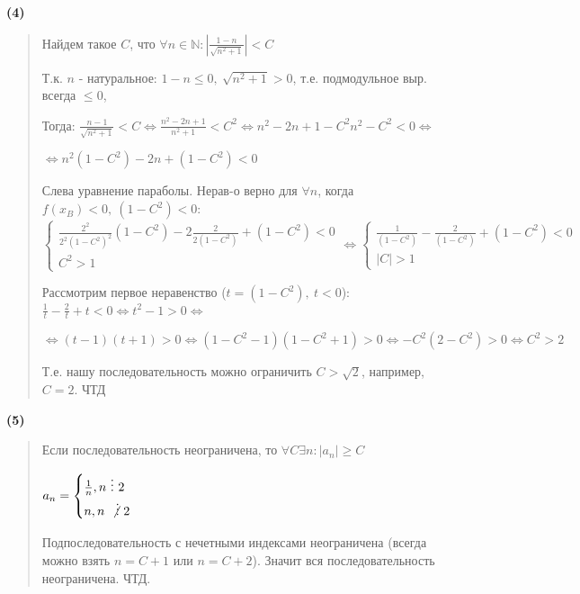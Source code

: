 \documentclass{article}
\begin{document}
\textsf{\textbf{(4)}}

\begin{quote}
Найдем такое $C$, что $\forall n \in \mathbb{N}: |\frac{1 - n}{\sqrt{n^2 + 1}}| < C$

Т.к. $n$ - натуральное: $1 - n \leq 0, \ \sqrt{n^2 + 1} > 0$, т.е. подмодульное выр. всегда $\leq 0$, 

Тогда: $\frac{n - 1}{\sqrt{n^2 + 1}} < C \Leftrightarrow 
\frac{n^2 - 2n + 1}{n^2 + 1} < C^2 \Leftrightarrow n^2 - 2n + 1 - C^2 n^2 - C^2 < 0 \Leftrightarrow$

$\Leftrightarrow n^2(1 - C^2) - 2n + (1 - C^2) < 0$

Слева уравнение параболы. Нерав-о верно для $\forall n$, когда $f(x_{B}) < 0, \ (1 - C^2) < 0$:
$
\begin{cases}
   \frac{2^2}{2^2(1 - C^2)^2}(1 - C^2) - 2\frac{2}{2(1 - C^2)} + (1 - C^2) < 0 \\
   C^2 > 1
\end{cases} \Longleftrightarrow
\begin{cases}
   \frac{1}{(1 - C^2)} - \frac{2}{(1 - C^2)} + (1 - C^2) < 0 \\
   |C| > 1
\end{cases}
$ 

Рассмотрим первое неравенство ($t = (1 - C^2), \ t < 0$):
$\frac{1}{t} - \frac{2}{t} + t < 0 \Leftrightarrow t^2 - 1 > 0 \Leftrightarrow$

$\Leftrightarrow (t - 1)(t + 1) > 0 \Leftrightarrow (1 - C^2 - 1)(1 - C^2 + 1) > 0 \Leftrightarrow -C^2
(2 - C^2) > 0 \Leftrightarrow C^2 > 2$

Т.е. нашу последовательность можно ограничить $C > \sqrt{2}$, например, $C = 2$. ЧТД

\end{quote}


\textsf{\textbf{(5)}}
\begin{quote}
   Если последовательность неограничена, то $\forall C \exists n: |a_n| \geq C$ 
   
   $a_n = \begin{cases}  \frac{1}{n} , n \ \vdots \ 2\\ n , n \ \not \vdots \ 2 \end{cases}$

   Подпоследовательность с нечетными индексами неограничена (всегда можно взять $n = C + 1$ или $n = C + 2$). Значит 
   вся последовательность неограничена. ЧТД.
\end{quote}
\end{document}
